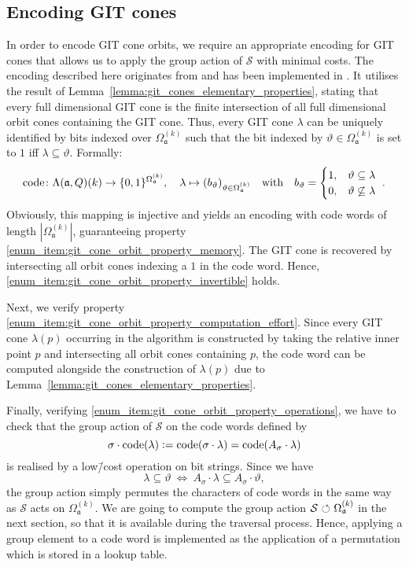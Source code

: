 \subsection*{Encoding GIT cones}
In order to encode GIT cone orbits, we require an appropriate encoding for GIT cones that allows us to apply the group action of $\mathcal{S}$ with minimal costs. The encoding described here originates from \cite[Construction 4.3]{gitfan_symmetry} and has been implemented in \gitfanlib{}. It utilises the result of Lemma~\ref{lemma:git_cones_elementary_properties}, stating that every full dimensional GIT cone is the finite intersection of all full dimensional orbit cones containing the GIT cone. Thus, every GIT cone $\lambda$ can be uniquely identified by bits indexed over $\Omega_\mathfrak{a}^{(k)}$ such that the bit indexed by $\vartheta\in\Omega_\mathfrak{a}^{(k)}$ is set to $1$ iff $\lambda \subseteq \vartheta$. Formally:
$$\text{code}\colon \Lambda(\mathfrak{a},Q)(k) \rightarrow \{0,1\}^{\Omega_\mathfrak{a}^{(k)}},\quad
\lambda \mapsto (b_\vartheta)_{\vartheta\in\Omega_\mathfrak{a}^{(k)}}\quad\text{with}\quad
b_\vartheta = 
\begin{cases}
1, & \vartheta\subseteq\lambda \\
0, & \vartheta\not\subseteq\lambda
\end{cases}\ .
$$
Obviously, this mapping is injective and yields an encoding with code words of length $|\Omega_\mathfrak{a}^{(k)}|$, guaranteeing property \ref{enum_item:git_cone_orbit_property_memory}. The GIT cone is recovered by intersecting all orbit cones indexing a $1$ in the code word. Hence, \ref{enum_item:git_cone_orbit_property_invertible} holds.

Next, we verify property \ref{enum_item:git_cone_orbit_property_computation_effort}. Since every GIT cone $\lambda(p)$ occurring in the algorithm is constructed by taking the relative inner point $p$ and intersecting all orbit cones containing $p$, the code word can be computed alongside the construction of $\lambda(p)$ due to Lemma~\ref{lemma:git_cones_elementary_properties}.

Finally, verifying \ref{enum_item:git_cone_orbit_property_operations},  we have to check that the group action of $\mathcal{S}$ on the code words defined by
$$\sigma\cdot\text{code}(\lambda) \mathrel{\mathop:}= \text{code}(\sigma\cdot\lambda) = \text{code}(A_\sigma\cdot\lambda)$$
is realised by a low\=/cost operation on bit strings. Since we have
$$\lambda\subseteq\vartheta\ \Leftrightarrow\ A_\sigma\cdot\lambda\subseteq A_\sigma\cdot\vartheta,$$ the group action simply permutes the characters of code words in the same way as $\mathcal{S}$ acts on $\Omega_\mathfrak{a}^{(k)}$. We are going to compute the group action $\mathcal{S}{\ \circlearrowleft\ }\Omega_\mathfrak{a}^{(k)}$ in the next section, so that it is available during the traversal process. Hence, applying a group element to a code word is implemented as the application of a permutation which is stored in a lookup table.

